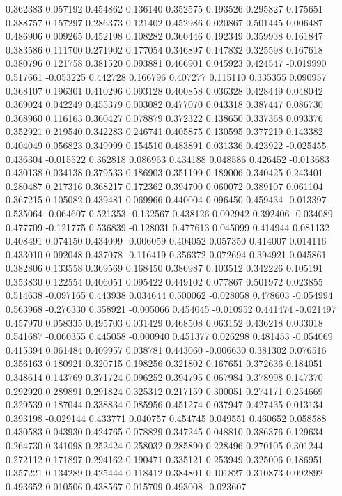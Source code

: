 0.362383
0.057192
0.454862
0.136140
0.352575
0.193526
0.295827
0.175651
0.388757
0.157297
0.286373
0.121402
0.452986
0.020867
0.501445
0.006487
0.486906
0.009265
0.452198
0.108282
0.360446
0.192349
0.359938
0.161847
0.383586
0.111700
0.271902
0.177054
0.346897
0.147832
0.325598
0.167618
0.380796
0.121758
0.381520
0.093881
0.466901
0.045923
0.424547
-0.019990
0.517661
-0.053225
0.442728
0.166796
0.407277
0.115110
0.335355
0.090957
0.368107
0.196301
0.410296
0.093128
0.400858
0.036328
0.428449
0.048042
0.369024
0.042249
0.455379
0.003082
0.477070
0.043318
0.387447
0.086730
0.368960
0.116163
0.360427
0.078879
0.372322
0.138650
0.337368
0.093376
0.352921
0.219540
0.342283
0.246741
0.405875
0.130595
0.377219
0.143382
0.404049
0.056823
0.349999
0.154510
0.483891
0.031336
0.423922
-0.025455
0.436304
-0.015522
0.362818
0.086963
0.434188
0.048586
0.426452
-0.013683
0.430138
0.034138
0.379533
0.186903
0.351199
0.189006
0.340425
0.243401
0.280487
0.217316
0.368217
0.172362
0.394700
0.060072
0.389107
0.061104
0.367215
0.105082
0.439481
0.069966
0.440004
0.096450
0.459434
-0.013397
0.535064
-0.064607
0.521353
-0.132567
0.438126
0.092942
0.392406
-0.034089
0.477709
-0.121775
0.536839
-0.128031
0.477613
0.045099
0.414944
0.081132
0.408491
0.074150
0.434099
-0.006059
0.404052
0.057350
0.414007
0.014116
0.433010
0.092048
0.437078
-0.116419
0.356372
0.072694
0.394921
0.045861
0.382806
0.133558
0.369569
0.168450
0.386987
0.103512
0.342226
0.105191
0.353830
0.122554
0.406051
0.095422
0.449102
0.077867
0.501972
0.023855
0.514638
-0.097165
0.443938
0.034644
0.500062
-0.028058
0.478603
-0.054994
0.563968
-0.276330
0.358921
-0.005066
0.454045
-0.010952
0.441474
-0.021497
0.457970
0.058335
0.495703
0.031429
0.468508
0.063152
0.436218
0.033018
0.541687
-0.060355
0.445058
-0.000940
0.451377
0.026298
0.481453
-0.054069
0.415394
0.061484
0.409957
0.038781
0.443060
-0.006630
0.381302
0.076516
0.356163
0.180921
0.320715
0.198256
0.321802
0.167651
0.372636
0.184051
0.348614
0.143769
0.371724
0.096252
0.394795
0.067984
0.378998
0.147370
0.292920
0.289891
0.291824
0.325312
0.217159
0.300051
0.274171
0.254669
0.329539
0.187044
0.338834
0.085956
0.451274
0.037947
0.427435
0.013134
0.393198
-0.029144
0.433771
0.040757
0.454745
0.049551
0.460652
0.058588
0.430583
0.043930
0.424765
0.078829
0.347245
0.048810
0.386376
0.129634
0.264730
0.341098
0.252424
0.258032
0.285890
0.228496
0.270105
0.301244
0.272112
0.171897
0.294162
0.190471
0.335121
0.253949
0.325006
0.186951
0.357221
0.134289
0.425444
0.118412
0.384801
0.101827
0.310873
0.092892
0.493652
0.010506
0.438567
0.015709
0.493008
-0.023607
